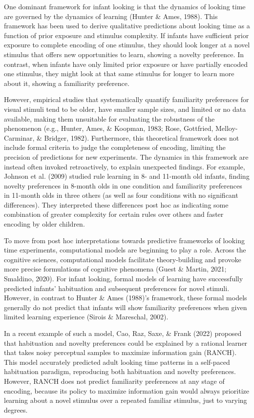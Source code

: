 \documentclass[10pt, letterpaper]{article}
\begin{document}
One dominant framework for infant looking is that the dynamics of
looking time are governed by the dynamics of learning (Hunter \& Ames,
1988). This framework has been used to derive qualitative predictions
about looking time as a function of prior exposure and stimulus
complexity. If infants have sufficient prior exposure to complete
encoding of one stimulus, they should look longer at a novel stimulus
that offers new opportunities to learn, showing a novelty preference. In
contrast, when infants have only limited prior exposure or have
partially encoded one stimulus, they might look at that same stimulus
for longer to learn more about it, showing a familiarity preference.

However, empirical studies that systematically quantify familiarity
preferences for visual stimuli tend to be older, have smaller sample
sizes, and limited or no data available, making them unsuitable for
evaluating the robustness of the phenomenon (e.g., Hunter, Ames, \&
Koopman, 1983; Rose, Gottfried, Melloy-Carminar, \& Bridger, 1982).
Furthermore, this theoretical framework does not include formal criteria
to judge the completeness of encoding, limiting the precision of
predictions for new experiments. The dynamics in this framework are
instead often invoked retroactively, to explain unexpected findings. For
example, Johnson et al. (2009) studied rule learning in 8- and 11-month
old infants, finding novelty preferences in 8-month olds in one
condition and familiarity preferences in 11-month olds in three others
(as well as four conditions with no significant differences). They
interpreted these differences post hoc as indicating some combination of
greater complexity for certain rules over others and faster encoding by
older children.

To move from post hoc interpretations towards predictive frameworks of
looking time experiments, computational models are beginning to play a
role. Across the cognitive sciences, computational models facilitate
theory-building and provoke more precise formulations of cognitive
phenomena (Guest \& Martin, 2021; Smaldino, 2020). For infant looking,
formal models of learning have successfully predicted infants'
habituation and subsequent preferences for novel stimuli. However, in
contrast to Hunter \& Ames (1988)'s framework, these formal models
generally do not predict that infants will show familiarity preferences
when given limited learning experience (Sirois \& Mareschal, 2002).

In a recent example of such a model, Cao, Raz, Saxe, \& Frank (2022)
proposed that habituation and novelty preferences could be explained by
a rational learner that takes noisy perceptual samples to maximize
information gain (RANCH). This model accurately predicted adult looking
time patterns in a self-paced habituation paradigm, reproducing both
habituation and novelty preferences. However, RANCH does not predict
familiarity preferences at any stage of encoding, because its policy to
maximize information gain would always prioritize learning about a novel
stimulus over a repeated familiar stimulus, just to varying degrees.
\end{document}
